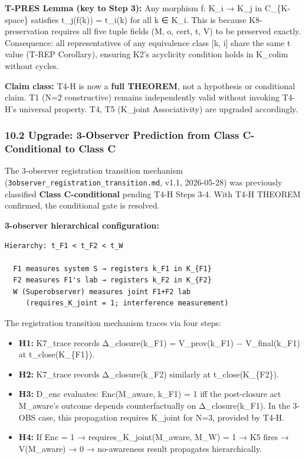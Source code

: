 \documentclass[
  11pt,
]{article}
\providecommand{\tightlist}{%
  \setlength{\itemsep}{0pt}\setlength{\parskip}{0pt}}
\begin{document}
\textbf{T-PRES Lemma (key to Step 3):} Any morphism f: K\_i → K\_j in
C\_\{K-space\} satisfies t\_j(f(k)) = t\_i(k) for all k ∈ K\_i. This is
because K8-preservation requires all five tuple fields (M, o, cert, t,
V) to be preserved exactly. Consequence: all representatives of any
equivalence class {[}k, i{]} share the same t value (T-REP Corollary),
ensuring K2's acyclicity condition holds in K\_colim without cycles.

\textbf{Claim class:} T4-H is now a \textbf{full THEOREM}, not a
hypothesis or conditional claim. T1 (N=2 constructive) remains
independently valid without invoking T4-H's universal property. T4, T5
(K\_joint Associativity) are upgraded accordingly.

\subsubsection{10.2 Upgrade: 3-Observer Prediction from Class
C-Conditional to Class
C}\label{upgrade-3-observer-prediction-from-class-c-conditional-to-class-c}

The 3-observer registration transition mechanism
(\texttt{3observer\_registration\_transition.md}, v1.1, 2026-05-28) was
previously classified \textbf{Class C-conditional} pending T4-H Steps
3-4. With T4-H THEOREM confirmed, the conditional gate is resolved.

\textbf{3-observer hierarchical configuration:}

\begin{verbatim}
Hierarchy: t_F1 < t_F2 < t_W

  F1 measures system S → registers k_F1 in K_{F1}
  F2 measures F1's lab → registers k_F2 in K_{F2}
  W (Superobserver) measures joint F1+F2 lab
     (requires_K_joint = 1; interference measurement)
\end{verbatim}

The registration transition mechanism traces via four steps:

\begin{itemize}
\tightlist
\item
  \textbf{H1:} K7\_trace records Δ\_closure(k\_F1) = V\_prov(k\_F1) −
  V\_final(k\_F1) at t\_close(K\_\{F1\}).
\item
  \textbf{H2:} K7\_trace records Δ\_closure(k\_F2) similarly at
  t\_close(K\_\{F2\}).
\item
  \textbf{H3:} D\_enc evaluates: Enc(M\_aware, k\_F1) = 1 iff the
  post-closure act M\_aware's outcome depends counterfactually on
  Δ\_closure(k\_F1). In the 3-OBS case, this propagation requires
  K\_joint for N=3, provided by T4-H.
\item
  \textbf{H4:} If Enc = 1 → requires\_K\_joint(M\_aware, M\_W) = 1 → K5
  fires → V(M\_aware) → 0 → no-awareness result propagates
  hierarchically.
\end{itemize}
\end{document}

